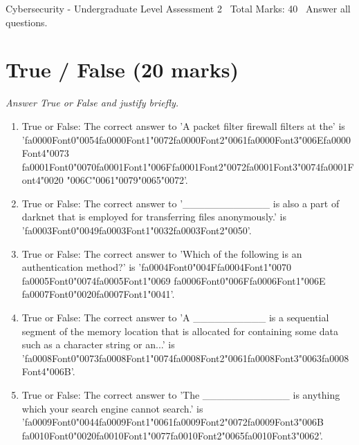 \documentclass[12pt]{article}
\begin{document}
\begin{center}
Cybersecurity - Undergraduate Level Assessment 2 \
Total Marks: 40 \
Answer all questions.
\end{center}

\section*{True / False (20 marks)}
\textit{Answer True or False and justify briefly.}
\begin{enumerate}[label=\arabic*.]
\item True or False: The correct answer to 'A packet filter firewall filters at the' is '{\csname fa0000Font0\endcsname\char"0054}{\csname fa0000Font1\endcsname\char"0072}{\csname fa0000Font2\endcsname\char"0061}{\csname fa0000Font3\endcsname\char"006E}{\csname fa0000Font4\endcsname\char"0073} {\csname fa0001Font0\endcsname\char"0070}{\csname fa0001Font1\endcsname\char"006F}{\csname fa0001Font2\endcsname\char"0072}{\csname fa0001Font3\endcsname\char"0074}{\csname fa0001Font4\endcsname\char"0020} {\char"006C}{\char"0061}{\char"0079}{\char"0065}{\char"0072}'.
\item True or False: The correct answer to '\_\_\_\_\_\_\_\_\_\_\_\_ is also a part of darknet that is employed for transferring files anonymously.' is '{\csname fa0003Font0\endcsname\char"0049}{\csname fa0003Font1\endcsname\char"0032}{\csname fa0003Font2\endcsname\char"0050}'.
\item True or False: The correct answer to 'Which of the following is an authentication method?' is '{\csname fa0004Font0\endcsname\char"004F}{\csname fa0004Font1\endcsname\char"0070} {\csname fa0005Font0\endcsname\char"0074}{\csname fa0005Font1\endcsname\char"0069} {\csname fa0006Font0\endcsname\char"006F}{\csname fa0006Font1\endcsname\char"006E} {\csname fa0007Font0\endcsname\char"0020}{\csname fa0007Font1\endcsname\char"0041}'.
\item True or False: The correct answer to 'A \_\_\_\_\_\_\_\_\_\_ is a sequential segment of the memory location that is allocated for containing some data such as a character string or an...' is '{\csname fa0008Font0\endcsname\char"0073}{\csname fa0008Font1\endcsname\char"0074}{\csname fa0008Font2\endcsname\char"0061}{\csname fa0008Font3\endcsname\char"0063}{\csname fa0008Font4\endcsname\char"006B}'.
\item True or False: The correct answer to 'The \_\_\_\_\_\_\_\_\_\_\_\_ is anything which your search engine cannot search.' is '{\csname fa0009Font0\endcsname\char"0044}{\csname fa0009Font1\endcsname\char"0061}{\csname fa0009Font2\endcsname\char"0072}{\csname fa0009Font3\endcsname\char"006B} {\csname fa0010Font0\endcsname\char"0020}{\csname fa0010Font1\endcsname\char"0077}{\csname fa0010Font2\endcsname\char"0065}{\csname fa0010Font3\endcsname\char"0062}'.

\end{enumerate}
\end{document}

